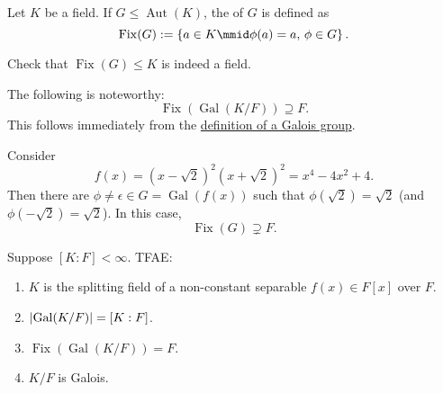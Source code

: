 \documentclass[notoc,notitlepage,nobib]{tufte-book}
\DeclareMathOperator{\Aut}{Aut}
\DeclareMathOperator{\Gal}{Gal}
\DeclareMathOperator{\Fix}{Fix}
\begin{document}
\begin{defn}\label{defn:fixed_field}
  Let $K$ be a field. If $G \leq \Aut(K)$, the  of $G$ is
  defined as
  \begin{equation*}
    \Fix(G) := \left\{ a \in K \mmid \phi(a) = a, \, \phi \in G \right\}.
  \end{equation*}
\end{defn}

\begin{ex}
  Check that $\Fix(G) \leq K$ is indeed a field.
\end{ex}

\begin{remark}
  The following is noteworthy:
  \begin{equation*}
    \Fix(\Gal(K / F)) \supseteq F.
  \end{equation*}
  This follows immediately from the \hyperref[defn:galois_group]{definition of a
  Galois group}.
\end{remark}

\begin{eg}
  Consider
  \begin{equation*}
    f(x) = (x - \sqrt{2})^2 (x + \sqrt{2})^2 = x^4 - 4x^2 + 4.
  \end{equation*}
  Then there are $\phi \neq \epsilon \in G = \Gal(f(x))$ such that
  $\phi(\sqrt{2}) = \sqrt{2}$ (and $\phi(-\sqrt{2}) = \sqrt{2}$). In this case,
  \begin{equation*}
    \Fix(G) \supsetneq F.
  \end{equation*}
\end{eg}

\begin{thm}\label{thm:characterization_of_galois_extensions}
  Suppose $[ K : F ] < \infty$. TFAE:
  \begin{enumerate}
    \item $K$ is the splitting field of a non-constant separable $f(x) \in F[x]$
      over $F$.
    \item $\abs{\Gal(K / F)} = [ K : F ]$.
    \item $\Fix(\Gal(K / F)) = F$.
    \item $K / F$ is Galois.
  \end{enumerate}
\end{thm}
\end{document}
